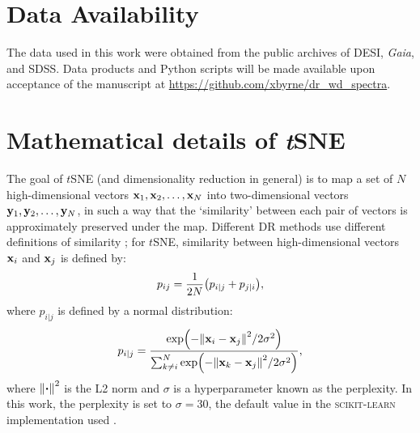 \documentclass[fleqn,usenatbib]{mnras}
\def\xb{\vb{x}}
\def\yb{\vb{y}}
\begin{document}
\section*{Data Availability}

The data used in this work were obtained from the public archives of DESI, \textit{Gaia}, and SDSS.
Data products and Python scripts will be made available upon acceptance of the manuscript at \url{https://github.com/xbyrne/dr_wd_spectra}.









\appendix

\section{Mathematical details of \textit{t}SNE}
\label{sec:app}

The goal of $t$SNE (and dimensionality reduction in general) is to map a set of $N$ high-dimensional vectors $\xb_1, \xb_2, \dots, \xb_N$ into two-dimensional vectors $\yb_1, \yb_2, \dots, \yb_N$, in such a way that the `similarity' between each pair of vectors is approximately preserved under the map.
Different DR methods use different definitions of similarity \citep{umap}; for $t$SNE, similarity between high-dimensional vectors $\xb_i$ and $\xb_j$ is defined by:
\begin{equation}
p_{ij}
= \frac{1}{2N} \qty(
    p_{i|j} + p_{j|i}
),
\end{equation}
where $p_{i|j}$ is defined by a normal distribution:
\begin{equation}
p_{i|j}
= \frac{
    \exp(-\norm{\xb_i - \xb_j}^2 / 2\sigma^2)
}{
    \sum_{k\neq i}^N
    \exp(-\norm{\xb_k - \xb_j}^2 / 2\sigma^2)
},
\end{equation}
where $\norm{\vdot}^2$ is the L2 norm and $\sigma$ is a hyperparameter known as the perplexity.
In this work, the perplexity is set to $\sigma=30$, the default value in the \textsc{scikit-learn} implementation used \citep{sklearn}.
\end{document}
